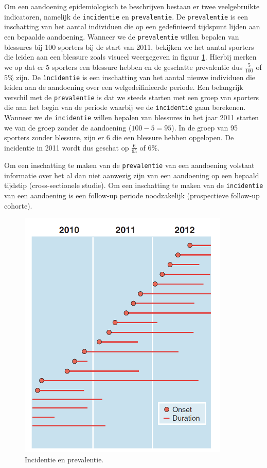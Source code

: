 \documentclass[
]{book}
\theoremstyle{definition}
\theoremstyle{definition}
\theoremstyle{definition}
\theoremstyle{definition}
\theoremstyle{remark}
\begin{document}
Om een aandoening epidemiologisch te beschrijven bestaan er twee veelgebruikte indicatoren, namelijk de \texttt{incidentie} en \texttt{prevalentie}. De \texttt{prevalentie} is een inschatting van het aantal individuen die op een gedefinieerd tijdspunt lijden aan een bepaalde aandoening. Wanneer we de \texttt{prevalentie} willen bepalen van blessures bij 100 sporters bij de start van 2011, bekijken we het aantal sporters die leiden aan een blessure zoals visueel weergegeven in figuur \ref{fig:incprev}. Hierbij merken we op dat er 5 sporters een blessure hebben en de geschatte prevalentie dus \(\frac{5}{100}\) of \(5\%\) zijn. De \texttt{ìncidentie} is een inschatting van het aantal nieuwe individuen die leiden aan de aandoening over een welgedeifinieerde periode. Een belangrijk verschil met de \texttt{prevalentie} is dat we steeds starten met een groep van sporters die aan het begin van de periode waarbij we de \texttt{incidentie} gaan berekenen. Wanneer we de \texttt{incidentie} willen bepalen van blessures in het jaar 2011 starten we van de groep zonder de aandoening (\(100 - 5 = 95\)). In de groep van 95 sporters zonder blessure, zijn er \(6\) die een blessure hebben opgelopen. De incidentie in 2011 wordt dus geschat op \(\frac{6}{95}\) of 6\(\%\).

Om een inschatting te maken van de \texttt{prevalentie} van een aandoening volstaat informatie over het al dan niet aanwezig zijn van een aandoening op een bepaald tijdstip (cross-sectionele studie). Om een inschatting te maken van de \texttt{incidentie} van een aandoening is een follow-up periode noodzakelijk (prospectieve follow-up cohorte).

\begin{figure}
\includegraphics[width=1\linewidth]{img/inc_prev} \caption{Incidentie en prevalentie.}\label{fig:incprev}
\end{figure}
\end{document}
